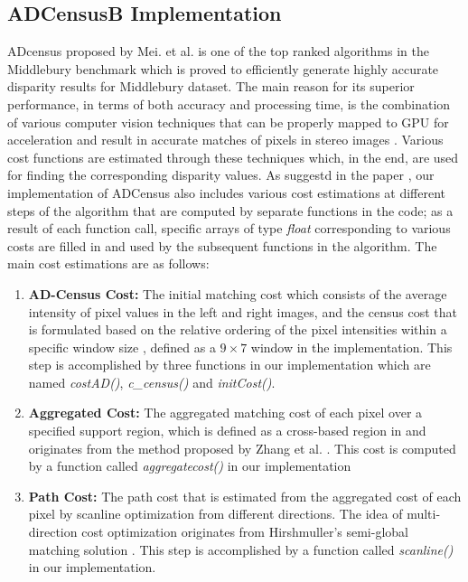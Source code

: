 \subsection{ADCensusB Implementation} \label{subsec:adcB}
ADcensus proposed by Mei. et al. is one of the top ranked algorithms in the Middlebury benchmark \cite{mideval} which is proved to efficiently generate highly accurate disparity 
results for Middlebury dataset. The main reason for its superior performance, in terms of both accuracy and processing time, is the combination of various computer vision techniques that can 
be properly mapped to GPU for acceleration and result in accurate matches of pixels in stereo images \cite{mei11}.  Various cost functions are estimated through these techniques 
which, in the end, are used for finding the corresponding
disparity values. As suggestd in the paper \cite{mei11}, our implementation of ADCensus also includes various cost estimations
at different steps of the algorithm that are computed by separate functions in the code; as a result of each function call, 
specific arrays of type \textit{float} corresponding to various costs are filled in and used by the subsequent functions in the algorithm.
The main cost estimations are as follows:
\begin{enumerate}
\item \textbf{AD-Census Cost:} The initial matching cost which consists of the average intensity of pixel values in the left and right images, 
and the census cost that is formulated
based on the relative ordering of the pixel intensities within a specific window size \cite{hirseval09}, defined as a $9\times7$ window in the implementation. This 
step is accomplished by three functions in our implementation which are named \textit{costAD()}, \textit{c\_census()} and \textit{initCost()}.
\item \textbf{Aggregated Cost:} The aggregated matching cost of each pixel over a specified support region, which is defined as a cross-based 
region in \cite{mei11} and originates from the method proposed by Zhang et al. \cite{zha09}. This cost is computed by a function called \textit{aggregatecost()}
in our implementation
\item \textbf{Path Cost:} The path cost that is estimated from the aggregated cost of each pixel by scanline optimization from different directions. The idea of
multi-direction cost optimization originates from Hirshmuller's semi-global matching solution \cite{hir08}. This step is accomplished by a function called 
\textit{scanline()} in our implementation.
\end{enumerate}

